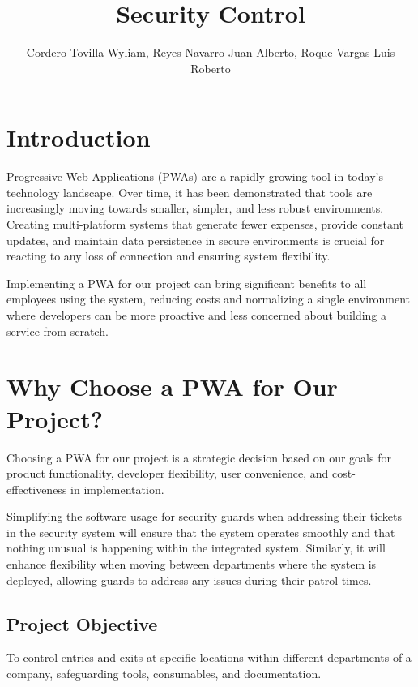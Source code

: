 \documentclass[journal]{IEEEtran}
\begin{document}
	
	\title{Security Control}
	\author{Cordero Tovilla Wyliam, Reyes Navarro Juan Alberto, Roque Vargas Luis Roberto}
	\maketitle
	
	\section*{Introduction}
	\fontsize{9}{10}\selectfont %
	Progressive Web Applications (PWAs) are a rapidly growing tool in today's technology landscape. Over time, it has been demonstrated that tools are increasingly moving towards smaller, simpler, and less robust environments. Creating multi-platform systems that generate fewer expenses, provide constant updates, and maintain data persistence in secure environments is crucial for reacting to any loss of connection and ensuring system flexibility.
	
	Implementing a PWA for our project can bring significant benefits to all employees using the system, reducing costs and normalizing a single environment where developers can be more proactive and less concerned about building a service from scratch.
	
	\section*{Why Choose a PWA for Our Project?}
	\fontsize{9}{10}\selectfont %
	Choosing a PWA for our project is a strategic decision based on our goals for product functionality, developer flexibility, user convenience, and cost-effectiveness in implementation.
	
	Simplifying the software usage for security guards when addressing their tickets in the security system will ensure that the system operates smoothly and that nothing unusual is happening within the integrated system. Similarly, it will enhance flexibility when moving between departments where the system is deployed, allowing guards to address any issues during their patrol times.
	
	\subsection*{Project Objective}
	\fontsize{9}{10}\selectfont %
	To control entries and exits at specific locations within different departments of a company, safeguarding tools, consumables, and documentation.
	
\end{document}
